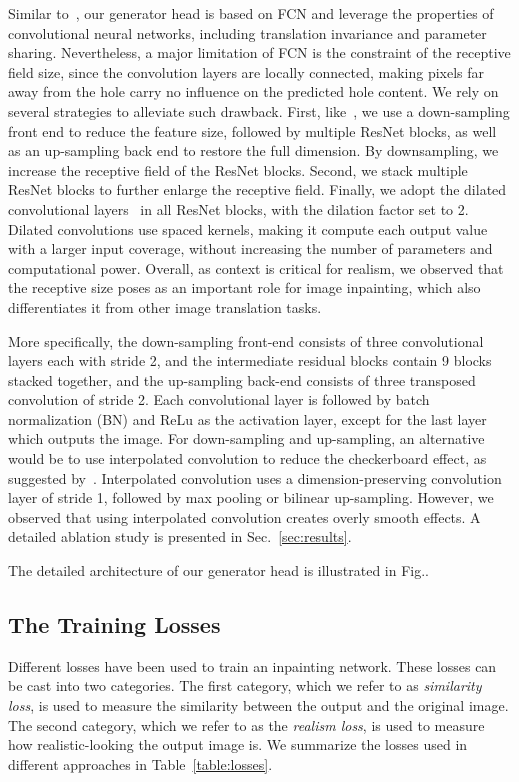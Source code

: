 Similar to~\cite{iizuka2017globally}, our generator head is based on FCN and leverage the properties of convolutional neural networks, including translation invariance and parameter sharing. Nevertheless, a major limitation of FCN is the constraint of the receptive field size, since the convolution layers are locally connected, making pixels far away from the hole carry no influence on the predicted hole content. We rely on several strategies to alleviate such drawback. First, like~\cite{iizuka2017globally}, we use a down-sampling front end to reduce the feature size, followed by multiple ResNet blocks, as well as an up-sampling back end to restore the full dimension. By downsampling, we increase the receptive field of the ResNet blocks. Second, we stack multiple ResNet blocks to further enlarge the receptive field. Finally, we adopt the dilated convolutional layers~\cite{yu2015multi} in all ResNet blocks, with the dilation factor set to 2. Dilated convolutions use spaced kernels, making it compute each output value with a larger input coverage, without increasing the number of parameters and computational power. Overall, as context is critical for realism, we observed that the receptive size poses as an important role for image inpainting, which also differentiates it from other image translation tasks. 

More specifically, the down-sampling front-end consists of three convolutional layers each with stride 2, and the intermediate residual blocks contain 9 blocks stacked together, and the up-sampling back-end consists of three transposed convolution of stride 2. Each convolutional layer is followed by batch normalization (BN) and ReLu as the activation layer, except for the last layer which outputs the image. For down-sampling and up-sampling, an alternative would be to use interpolated convolution to reduce the checkerboard effect, as suggested by~\cite{odena2016deconvolution}. Interpolated convolution uses a dimension-preserving convolution layer of stride 1, followed by max pooling or bilinear up-sampling. However, we observed that using interpolated convolution creates overly smooth effects. A detailed ablation study is presented in Sec.~\ref{sec:results}.

The detailed architecture of our generator head is illustrated in Fig..

\subsection{The Training Losses}
Different losses have been used to train an inpainting network. These losses can be cast into two categories. The first category, which we refer to as \textit{similarity loss}, is used to measure the similarity between the output and the original image. The second category, which we refer to as the \textit{realism loss}, is used to measure how realistic-looking the output image is. We summarize the losses used in different approaches in Table~\ref{table:losses}. 

